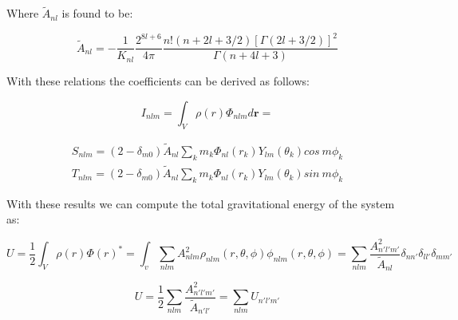 \documentclass[14pt]{article}
\begin{document}
Where $\tilde{A}_{nl}$ is found to be:

\begin{equation}
    \tilde{A}_{nl} = - \frac{1}{K_{nl}}\frac{2^{8l+6}}{4\pi}\frac{n!(n+2l+3/2)[\Gamma(2l+3/2)]^2}{\Gamma(n+4l+3)}
\end{equation}

With these relations the coefficients can be derived as follows:

\begin{equation}\label{eq:coefficients}
  I_{nlm} = \int_V \rho(r) \Phi_{nlm} d\textbf{r} = 
\end{equation}


\begin{equation}\label{eq:coeff}
  \begin{aligned}
    S_{nlm} = (2-\delta_{m0})\tilde{A}_{nl} \sum_k m_k
  \Phi_{nl}(r_k)Y_{lm}(\theta_k) cos\ m\phi_k \\
    T_{nlm} = (2-\delta_{m0})\tilde{A}_{nl} \sum_k m_k 
  \Phi_{nl}(r_k)Y_{lm}(\theta_k) sin\ m\phi_k 
  \end{aligned}
\end{equation}


With these results we can compute the total gravitational energy of the system
as:

\begin{equation}
  U = \dfrac{1}{2} \int_V \rho(r)\Phi(r)^{*} = \int_v  \sum_{nlm} A_{nlm}^2 \rho_{nlm}(r,
  \theta, \phi) \phi_{nlm}(r, \theta, \phi) = \sum_{nlm}
  \frac{A_{n'l'm'}^2}{\tilde{A}_{nl}}
  \delta_{nn'}\delta_{ll'}\delta_{mm'} 
\end{equation}

\begin{equation}
  U = \dfrac{1}{2}\sum_{nlm} \frac{A_{n'l'm'}^2}{\tilde{A}_{n'l'}} = \sum_{nlm} U_{n'l'm'}
\end{equation}
\end{document}
